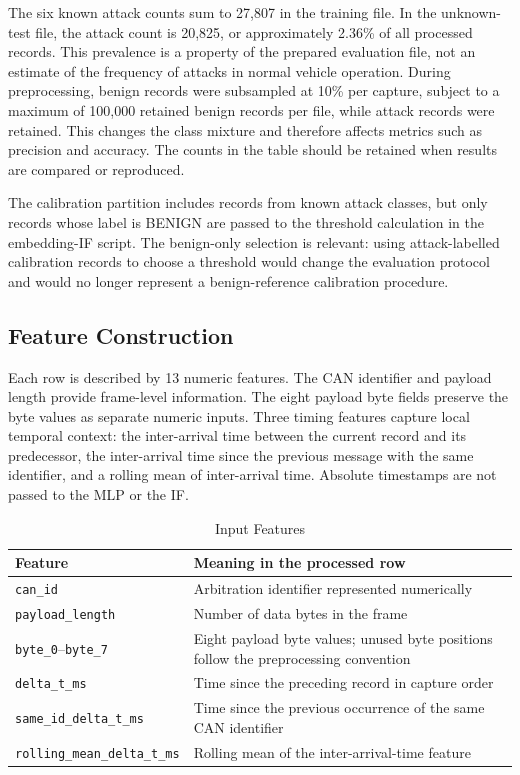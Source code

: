\documentclass[journal]{IEEEtran}
\begin{document}
The six known attack counts sum to 27,807 in the training file. In the unknown-test file, the attack count is 20,825, or approximately 2.36\% of all processed records. This prevalence is a property of the prepared evaluation file, not an estimate of the frequency of attacks in normal vehicle operation. During preprocessing, benign records were subsampled at 10\% per capture, subject to a maximum of 100,000 retained benign records per file, while attack records were retained. This changes the class mixture and therefore affects metrics such as precision and accuracy. The counts in the table should be retained when results are compared or reproduced.

The calibration partition includes records from known attack classes, but only records whose label is BENIGN are passed to the threshold calculation in the embedding-IF script. The benign-only selection is relevant: using attack-labelled calibration records to choose a threshold would change the evaluation protocol and would no longer represent a benign-reference calibration procedure.

\subsection{Feature Construction}
Each row is described by 13 numeric features. The CAN identifier and payload length provide frame-level information. The eight payload byte fields preserve the byte values as separate numeric inputs. Three timing features capture local temporal context: the inter-arrival time between the current record and its predecessor, the inter-arrival time since the previous message with the same identifier, and a rolling mean of inter-arrival time. Absolute timestamps are not passed to the MLP or the IF.

\begin{table}[!t]
\caption{Input Features}
\label{tab:features}
\centering\footnotesize
\begin{tabular}{p{}p{}}
\toprule
Feature & Meaning in the processed row\\
\midrule
\texttt{can\_id} & Arbitration identifier represented numerically\\
\texttt{payload\_length} & Number of data bytes in the frame\\
\texttt{byte\_0}--\texttt{byte\_7} & Eight payload byte values; unused byte positions follow the preprocessing convention\\
\texttt{delta\_t\_ms} & Time since the preceding record in capture order\\
\texttt{same\_id\_delta\_t\_ms} & Time since the previous occurrence of the same CAN identifier\\
\texttt{rolling\_mean\_delta\_t\_ms} & Rolling mean of the inter-arrival-time feature\\
\bottomrule
\end{tabular}
\end{table}
\end{document}
